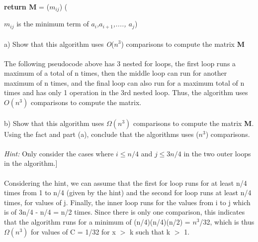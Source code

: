 \documentclass{article}
\begin{document}
\indent \textbf{return M} = ({$m_{ij}$}) ({\emph{{$m_{ij}$}} is the minimum term of \emph {$a_{i}$,$a_{i+1}$,...., $a_{j}$}) \\ \\ 
a) Show that this algorithm uses \emph{O}($n^3$) comparisons to compute the matrix \textbf {M} \\ \\ 
The following pseudocode above has 3 nested for loops, the first loop runs a maximum of a total of n times, then the middle loop can run for another maximum of n times, and the final loop can also run for a maximum total of n times and has only 1 operation in the 3rd nested loop. Thus, the algorithm uses $O(n^3)$ comparisons to compute the matrix. \\\\
b) Show that this algorithm uses $\Omega(n^3)$ comparisons to compute the matrix \textbf {M}. Using the fact and part (a), conclude that the algorithms uses ($n^3$) comparisons. \\ \\ \emph{Hint:} Only consider the cases where \emph{$i \leq n/4$} and \emph {$j \leq 3n/4$} in the two outer loops in the algorithm.] \\\\
Considering the hint, we can assume that the first for loop runs for at least n/4 times from 1 to n/4 (given by the hint) and the second for loop runs at least n/4 times, for values of j. Finally, the inner loop runs for the values from i to j which is of 3n/4 - n/4  = n/2 times. Since there is only one comparison, this indicates that the algorithm runs for a minimum of (n/4)(n/4)(n/2) = $n^3$/32, which is thus $\Omega(n^3)$ for values of C = 1/32 for x $>$ k such that k $>$ 1.  
\newpage

}
\end{document}
